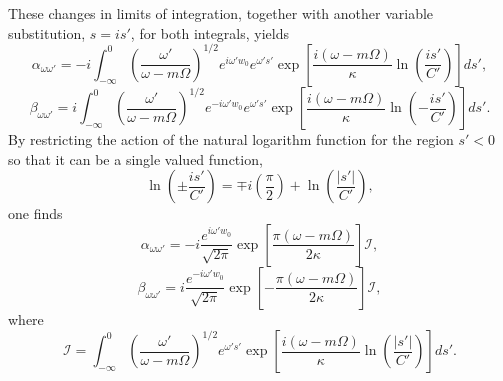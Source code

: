 \documentclass[
12pt,		%
openright,	%
twoside,  %
a4paper,			%
chapter=TITLE,		%
english,			%
french,				%
spanish,			%
brazil				%
]{USPSC-classe/USPSC}
\begin{document}
These changes in limits of integration, together with another variable substitution, $s= is'$, for both integrals, yields
\begin{equation}
    \alpha_{\omega\omega'}=-i\int^{0}_{-\infty}\left(\frac{\omega'}{\omega-m\Omega}\right)^{1/2}e^{i\omega'w_0}e^{\omega's'}\exp\left[{\frac{i(\omega-m\Omega)}{\kappa}\ln\left({\frac{is'}{C'}}\right)}\right]ds',
\end{equation}
\begin{equation}
    \beta_{\omega\omega'}=i\int^{0}_{-\infty}\left(\frac{\omega'}{\omega-m\Omega}\right)^{1/2}e^{-i\omega'w_0}e^{\omega's'}\exp\left[{\frac{i(\omega-m\Omega)}{\kappa}\ln\left({-\frac{is'}{C'}}\right)}\right]ds'.
\end{equation}
By restricting the action of the natural logarithm function for the region $s'<0$ so that it can be a single valued function,
\begin{equation}
    \ln{\left(\pm\frac{is'}{C'}\right)}=\mp i\left(\frac{\pi}{2}\right)+\ln{\left(\frac{|s'|}{C'}\right)},
\end{equation}
one finds
\begin{equation}\label{alpha3}
    \alpha_{\omega\omega'}=-i\frac{e^{i\omega'w_0}}{\sqrt{2\pi}}\exp\left[{\frac{\pi(\omega-m\Omega)}{2\kappa}}\right]\mathcal{I},
\end{equation}
\begin{equation}\label{beta3}
    \beta_{\omega\omega'}=i\frac{e^{-i\omega'w_0}}{\sqrt{2\pi}}\exp\left[{-\frac{\pi(\omega-m\Omega)}{2\kappa}}\right]\mathcal{I},
\end{equation}
where
\begin{equation}
    \mathcal{I}=\int^{0}_{-\infty}\left(\frac{\omega'}{\omega-m\Omega}\right)^{1/2}e^{\omega's'}\exp{\left[{\frac{i(\omega-m\Omega)}{\kappa}\ln\left({\frac{|s'|}{C'}}\right)}\right]}ds'.
\end{equation}
\end{document}
